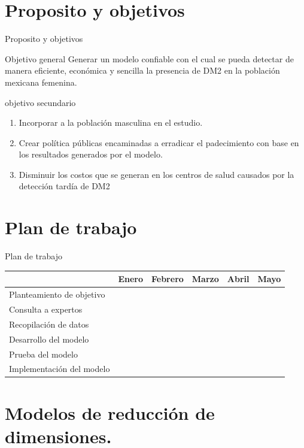 \documentclass[pdf]{beamer}
\begin{document}
\section{Proposito y objetivos}
\begin{frame}{Proposito y objetivos}
\begin{block}{Objetivo general}
Generar un modelo confiable con el cual se pueda detectar de manera eficiente, econ\'omica y sencilla la presencia de DM2 en la población mexicana femenina.
\end{block}

\begin{block}{objetivo secundario}
\begin{enumerate}
	\item Incorporar a la poblaci\'on masculina en el estudio.
	\item Crear política públicas encaminadas a erradicar el padecimiento con base en los resultados generados por el modelo.
	\item Disminuir los costos que se generan en los centros de salud causados por la detecci\'on tard\'ia de DM2
\end{enumerate}
\end{block}
\end{frame}

\section{Plan de trabajo}
\begin{frame}{Plan de trabajo}

\begin{tabular}{|l|l|l|l|l|l|}
\hline
&Enero&Febrero&Marzo&Abril&Mayo\\ \hline \hline
Planteamiento de objetivo&\cellcolor{blue}&&&&\\ \hline
Consulta a expertos&\cellcolor{blue}&&&&\\ \hline
Recopilación de datos&&\cellcolor{blue}&\cellcolor{blue}&&\\ \hline
Desarrollo del modelo&&&\cellcolor{blue}&\cellcolor{blue}&\\ \hline
Prueba del modelo&&&&\cellcolor{blue}&\cellcolor{blue}\\ \hline
Implementaci\'on del modelo&&&&&\cellcolor{blue}\\ \hline
\end{tabular}

\end{frame}

\section{Modelos de reducción de dimensiones.}
\end{document}
